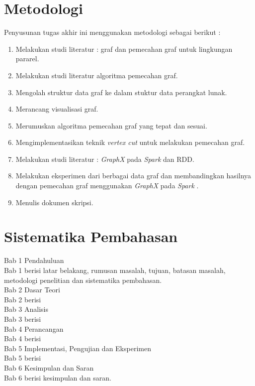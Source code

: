 
\section{Metodologi}
\label{sec:metlit}


Penyusunan tugas akhir ini menggunakan metodologi sebagai berikut :
\begin{enumerate}
	\item Melakukan studi literatur : graf dan pemecahan graf untuk lingkungan pararel.
		\item Melakukan studi literatur algoritma pemecahan graf.
		\item Mengolah struktur data graf ke dalam stuktur data perangkat lunak.
		\item Merancang visualisasi graf.
		\item Merumuskan algoritma pemecahan graf yang tepat dan sesuai.
		\item Mengimplementasikan teknik {\it vertex cut} untuk melakukan pemecahan graf.
		\item Melakukan studi literatur : {\it GraphX} pada {\it Spark} dan RDD.
		\item Melakukan eksperimen dari berbagai data graf dan membandingkan hasilnya dengan pemecahan graf menggunakan {\it GraphX} pada {\it Spark} .
		\item Menulis dokumen skripsi.
\end{enumerate}
	


\section{Sistematika Pembahasan}
\label{sec:sispem}


Bab 1 Pendahuluan\\
Bab 1 berisi latar belakang, rumusan masalah, tujuan, batasan masalah, metodologi penelitian dan sistematika pembahasan.\\


Bab 2 Dasar Teori\\
Bab 2 berisi \\


Bab 3 Analisis\\
Bab 3 berisi \\


Bab 4 Perancangan\\
Bab 4 berisi \\


Bab 5 Implementasi, Pengujian dan Eksperimen\\
Bab 5 berisi \\


Bab 6 Kesimpulan dan Saran\\
Bab 6 berisi kesimpulan dan saran.\\
